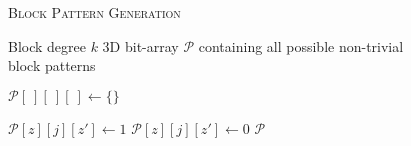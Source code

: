 
\begin{figure}[h]
	\noindent \hspace*{6pt}{\bf Algorithm 2.1}
	\textsc{Block Pattern Generation}\small
	\begin{algorithmic}[1]\label{alg:block-pattern-gen}
		\Require Block degree $k$
		\Ensure 3D bit-array $\mathcal{P}$ containing all possible non-trivial block patterns \vspace*{6pt}

		\State $\mathcal{P}[\ ][\ ][\ ] \leftarrow \{\}$ \hspace*{90pt}

			\State $\mathcal{P}[z][j][z'] \leftarrow 1$
		\Else
			\State $\mathcal{P}[z][j][z'] \leftarrow 0$
		\EndIf\EndFor\EndFor\EndFor
		\State\Return $\mathcal{P}$
		\end{algorithmic}
\end{figure}

